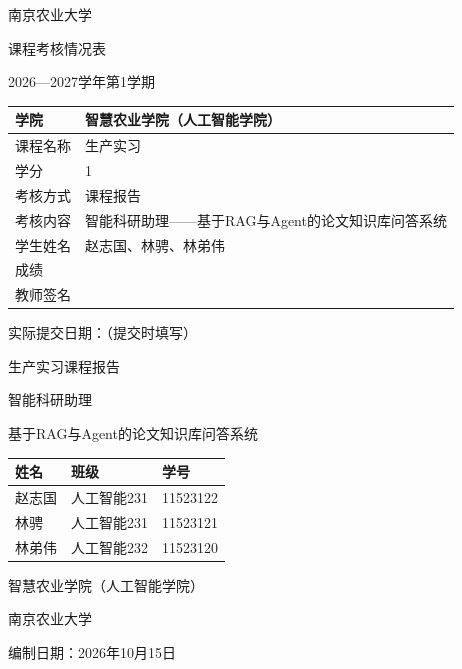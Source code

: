 \documentclass[UTF8,a4paper,zihao=-4,fontset=fandol]{ctexart}
\begin{document}
\hypersetup{pageanchor=false}
\begin{titlepage}\thispagestyle{empty}\centering
 {\heiti{}南京农业大学}\par\vspace{1.1cm}
 {\heiti{}课程考核情况表}\par\vspace{1.1cm}
 {2026—2027学年第1学期}\par\vspace{.9cm}
 \renewcommand{\arraystretch}{1.9}
 \begin{tabularx}{\linewidth}{|p{3cm}|X|}\hline
 学院 & 智慧农业学院（人工智能学院）\\\hline
 课程名称 & 生产实习\\\hline
 学分 & 1\\\hline
 考核方式 & 课程报告\\\hline
 考核内容 & 智能科研助理——基于RAG与Agent的论文知识库问答系统\\\hline
 学生姓名 & 赵志国、林骋、林弟伟\\\hline
 成绩 & \rule{0pt}{1.1cm}\\\hline
 教师签名 & \rule{0pt}{1.1cm}\\\hline
 \end{tabularx}
 \vfill\raggedright{\small 实际提交日期：\underline{\hspace{4cm}}\quad（提交时填写）}
\end{titlepage}
\begin{titlepage}\thispagestyle{empty}\centering
 {\heiti{}生产实习课程报告}\par\vspace{2cm}
 {\heiti{}智能科研助理}\par\vspace{.5cm}
 {\heiti{}基于RAG与Agent的论文知识库问答系统}\par\vspace{2cm}
 \renewcommand{\arraystretch}{1.6}
 \begin{tabular}{lll}\toprule 姓名 & 班级 & 学号\\\midrule
 赵志国 & 人工智能231 & 11523122\\
 林骋 & 人工智能231 & 11523121\\
 林弟伟 & 人工智能232 & 11523120\\\bottomrule\end{tabular}
 \vfill
 智慧农业学院（人工智能学院）\par
 南京农业大学\par\vspace{.4cm}
 编制日期：2026年10月15日
\end{titlepage}
\end{document}
